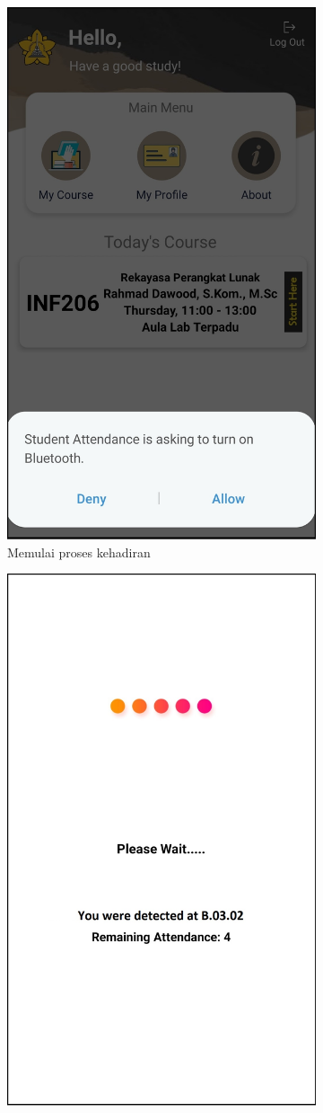 \begin{enumerate}[a.]
\begin{enumerate}[a.]
\begin{figure} [H]
\begin{subfigure}{.5\textwidth}
			      \includegraphics[width=.5\linewidth]{gambar/android/mahasiswa-6}
			      \caption{Memulai proses kehadiran}
		      \end{subfigure}
		      \vspace{1cm}
		      \newline
		      \begin{subfigure}{.5\textwidth}
			      \centering
			      \includegraphics[width=.5\linewidth]{gambar/android/mahasiswa-7}

\end{subfigure}
\end{figure}
\end{enumerate}
\end{enumerate}
